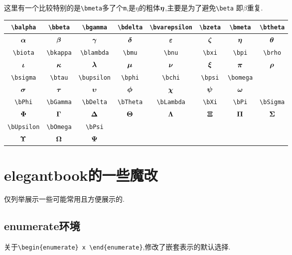 \documentclass[lang=cn,12pt,scheme=chinese,mode=simple,black]{elegantbook}
\begin{document}
这里有一个比较特别的是\verb|\bmeta|多了个\verb|m|,是$\eta$的粗体$\bm{\eta}$,主要是为了避免\verb|\beta| 即$\beta$重复.
\begin{center}
\renewcommand{\arraystretch}{1.4}
\begin{tabular}{|c|c|c|c|c|c|c|c|}
\hline\hline
\verb|\balpha| & \verb|\bbeta| & \verb|\bgamma| & \verb|\bdelta| & \verb|\bvarepsilon| & \verb|\bzeta| & \verb|\bmeta| & \verb|\btheta| \\
\hline
$\bm{\alpha}$ & $\bm{\beta}$ & $\bm{\gamma}$ & $\bm{\delta}$ & $\bm{\varepsilon}$ & $\bm{\zeta}$ & $\bm{\eta}$ & $\bm{\theta}$ \\
\hline\hline
\verb|\biota| & \verb|\bkappa| & \verb|\blambda| & \verb|\bmu| & \verb|\bnu| & \verb|\bxi| & \verb|\bpi| & \verb|\brho|\\
\hline
$\bm{\iota}$ & $\bm{\kappa}$ & $\bm{\lambda}$ & $\bm{\mu}$ & $\bm{\nu}$ & $\bm{\xi}$ & $\bm{\pi}$ & $\bm{\rho}$ \\
\hline\hline
\verb|\bsigma| & \verb|\btau| & \verb|\bupsilon| & \verb|\bphi| & \verb|\bchi| & \verb|\bpsi| & \verb|\bomega| &\\ 
\hline
$\bm{\sigma}$ & $\bm{\tau}$ & $\bm{\upsilon}$ & $\bm{\phi}$ & $\bm{\chi}$ & $\bm{\psi}$ & $\bm{\omega}$ &  \\
\hline\hline
\verb|\bPhi| & \verb|\bGamma| & \verb|\bDelta|&\verb|\bTheta| & \verb|\bLambda| & \verb|\bXi| & \verb|\bPi| & \verb|\bSigma| \\
\hline
$\bm{\Phi}$ & $\bm{\Gamma}$ & $\bm{\Delta}$ &$\bm{\Theta}$ & $\bm{\Lambda}$ & $\bm{\Xi}$ & $\bm{\Pi}$ & $\bm{\Sigma}$  \\
\hline\hline
 \verb|\bUpsilon|&\verb|\bOmega| & \verb|\bPsi| & & & & &\\
\hline
 $\bm{\Upsilon}$&$\bm{\Omega}$ & $\bm{\Psi}$ & & & & &\\
\hline\hline
\end{tabular}
\end{center}

\newpage
\section{elegantbook的一些魔改}
仅列举展示一些可能常用且方便展示的.

\subsection{enumerate环境}
关于\verb|\begin{enumerate} x \end{enumerate}|,修改了嵌套表示的默认选择.
\end{document}
